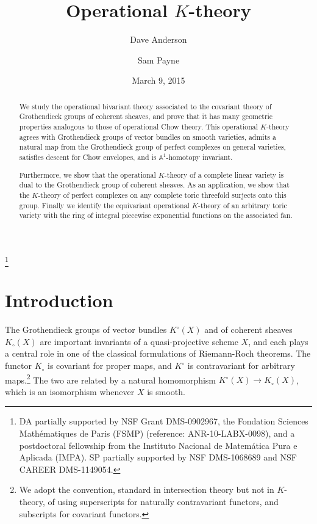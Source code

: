 \documentclass[11pt]{amsart}
\theoremstyle{definition}
\begin{document}
\title{Operational $K$-theory}

\author{Dave Anderson}
\address{Department of Mathematics\\The Ohio State University\\Columbus, OH 43210}

\author{Sam Payne}
\address{Department of Mathematics\\Yale University\\New Haven, CT 06511}
\keywords{}
\date{March 9, 2015}
\thanks{DA partially supported by NSF Grant DMS-0902967, the Fondation Sciences Math\'ematiques de Paris (FSMP) (reference: ANR-10-LABX-0098), and a postdoctoral fellowship from the Instituto Nacional de Matem\'atica Pura e Aplicada (IMPA).  SP partially supported by NSF DMS-1068689 and NSF CAREER DMS-1149054.}

\begin{abstract}
We study the operational bivariant theory associated to the covariant theory of Grothendieck groups of coherent sheaves, and prove that it has many geometric properties analogous to those of operational Chow theory.  This operational $K$-theory agrees with Grothendieck groups of vector bundles on smooth varieties, admits a natural map from the Grothen\-dieck group of perfect complexes on general varieties, satisfies descent for Chow envelopes, and is ${\mathbb{A}}^1$-homotopy invariant.

Furthermore, we show that the operational $K$-theory of a complete linear variety is dual to the Grothendieck group of coherent sheaves.  As an application, we show that the $K$-theory of perfect complexes on any complete toric threefold surjects onto this group.  Finally we identify the equivariant operational $K$-theory of an arbitrary toric variety with the ring of integral piecewise exponential functions on the associated fan.
\end{abstract}

\maketitle

\setcounter{tocdepth}{1}
\tableofcontents

\section{Introduction}

The Grothendieck groups of vector bundles $K^\circ(X)$ and of coherent sheaves $K_\circ(X)$ are important invariants of a quasi-projective scheme $X$, and each plays a central role in one of the classical formulations of Riemann-Roch theorems. The functor $K_\circ$ is covariant for proper maps, and $K^\circ$ is contravariant for arbitrary maps.\footnote{We adopt the convention, standard in intersection theory but not in $K$-theory, of using superscripts for naturally contravariant functors, and subscripts for covariant functors.}  The two are related by a natural homomorphism $K^\circ(X) \to K_\circ(X)$, which is an isomorphism whenever $X$ is smooth.
\end{document}
